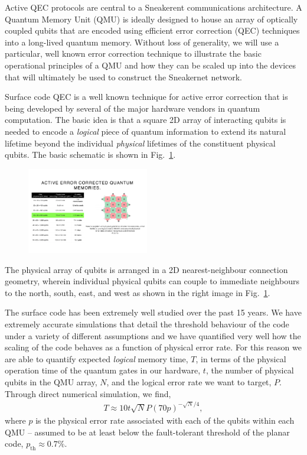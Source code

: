 \documentclass[twocolumn, aps, rmp, amsmath, amssymb, nofootinbib, superscriptaddress, longbibliography, floatfix, table-of-contents, eqsecnum]{revtex4-2}
\begin{document}
Active QEC protocols are central to a Sneakerent communications architecture. A Quantum Memory Unit (QMU) is ideally designed to house an array of optically coupled qubits that are encoded using efficient error correction (QEC) techniques into a long-lived quantum memory. Without loss of generality, we will use a particular, well known error correction technique to illustrate the basic operational principles of a QMU and how they can be scaled up into the devices that will ultimately be used to construct the Sneakernet network.

Surface code QEC is a well known technique for active error correction that is being developed by several of the major hardware vendors in quantum computation. The basic idea is that a square 2D array of interacting qubits is needed to encode a \textit{logical} piece of quantum information to extend its natural lifetime beyond the individual \textit{physical} lifetimes of the constituent physical qubits. The basic schematic is shown in Fig.~\ref{fig:array}. 

\begin{figure}[htbp!]
	\includegraphics[clip=true, width=0.475\textwidth]{array}
	\caption{} \label{fig:array}
\end{figure}

The physical array of qubits is arranged in a 2D nearest-neighbour connection geometry, wherein individual physical qubits can couple to immediate neighbours to the north, south, east, and west as shown in the right image in Fig.~\ref{fig:array}. 

The surface code has been extremely well studied over the past 15 years. We have extremely accurate simulations that detail the threshold behaviour of the code under a variety of different assumptions and we have quantified very well how the scaling of the code behaves as a function of physical error rate. For this reason we are able to quantify expected \textit{logical} memory time, $T$, in terms of the physical operation time of the quantum gates in our hardware, $t$, the number of physical qubits in the QMU array, $N$, and the logical error rate we want to target, $P$. Through direct numerical simulation, we find,
\begin{align} \label{eq:scale}
T \approx 10t\sqrt{N} P(70p)^{-\sqrt{N}/4},
\end{align}
where $p$ is the physical error rate associated with each of the qubits within each QMU -- assumed to be at least below the fault-tolerant threshold of the planar code, $p_\mathrm{th} \approx 0.7\%$.
\end{document}
